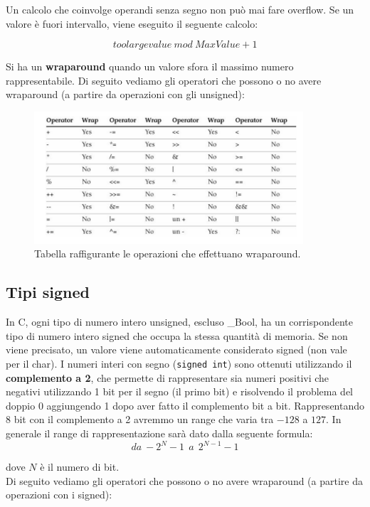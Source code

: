 Un calcolo che coinvolge operandi senza segno non può mai fare overflow.
Se un valore è fuori intervallo, viene eseguito il seguente calcolo:

\[
    toolargevalue \ mod \ MaxValue + 1
\]

Si ha un \textbf{wraparound} quando un valore sfora il massimo numero
rappresentabile. Di seguito vediamo gli operatori che possono o no avere
wraparound (a partire da operazioni con gli unsigned):

\begin{figure}[H]
    \centering
    \includegraphics[width=10cm, keepaspectratio]{capitoli/secure_coding/img/cap_2/wraparound.png}
    \caption{Tabella raffigurante le operazioni che effettuano wraparound.}
\end{figure}

\subsection{Tipi signed}

In C, ogni tipo di numero intero unsigned, escluso \_Bool, ha un corrispondente
tipo di numero intero signed che occupa la stessa quantità di memoria.
Se non viene precisato, un valore viene automaticamente considerato signed
(non vale per il char).
I numeri interi con segno (\verb|signed int|) sono ottenuti utilizzando il \textbf{complemento a 2},
che permette di rappresentare sia numeri positivi
che negativi utilizzando 1 bit per il segno (il primo bit) e risolvendo il problema del doppio 0 aggiungendo
1 dopo aver fatto il complemento bit a bit.
Rappresentando 8 bit con il complemento a 2 avremmo un range che varia tra $-128$ a $127$.
In generale il range di rappresentazione sarà dato dalla seguente formula:
\[
    da \ -2^{N} - 1 \ \ a \ \ 2^{N - 1} - 1
\]

dove $N$ è il numero di bit.\\
Di seguito vediamo gli operatori che possono o no avere wraparound (a partire da
operazioni con i signed):

